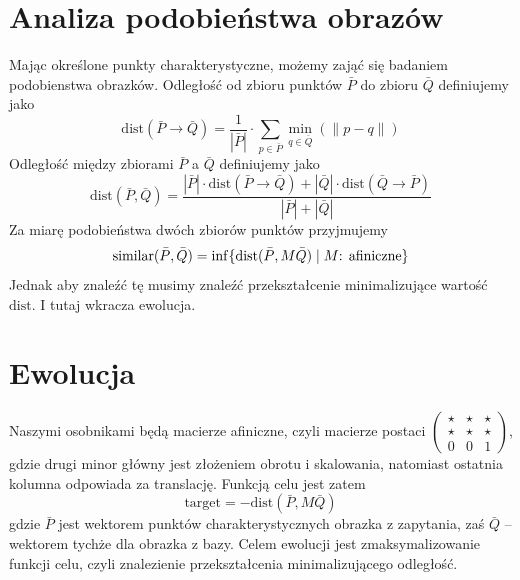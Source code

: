 \documentclass[a4paper,12pt,leqno]{article}
\newcommand{\nel}[1]{|#1|}
\newcommand{\dist}{\mathrm{dist}}
\newcommand{\target}{\mathrm{target}}
\begin{document}
\section{Analiza podobieństwa obrazów}

Mając określone punkty charakterystyczne, możemy zająć się badaniem podobienstwa obrazków.
Odległość od zbioru punktów $\bar P$ do zbioru $\bar Q$ definiujemy jako
\[ \dist(\bar P \rightarrow \bar Q) = \frac{1}{\nel{\bar P}} \cdot \sum_{p \in \bar P} \min_{q \in \bar Q}(\|p - q\|) \]
Odległość między zbiorami $\bar P$ a $\bar Q$ definiujemy jako
\[ \dist(\bar P, \bar Q) = \frac{\nel{\bar P} \cdot \dist(\bar P \rightarrow \bar Q) + \nel{\bar Q} \cdot \dist(\bar Q \rightarrow \bar P)}{\nel{\bar P} + \nel{\bar Q}} \]
Za miarę podobieństwa dwóch zbiorów punktów przyjmujemy
\[ \mathrm{similar}(\bar P, \bar Q) = \inf\{\dist(\bar P, M\bar Q) \;\arrowvert\; M\text{: afiniczne}\} \]
Jednak aby znaleźć tę musimy znaleźć przekształcenie minimalizujące wartość $\dist$. I tutaj wkracza ewolucja. 

\section{Ewolucja}

Naszymi osobnikami będą macierze afiniczne, czyli macierze postaci
$\begin{pmatrix}
\star & \star & \star \\
\star & \star & \star \\
0 & 0 & 1
\end{pmatrix}$, gdzie drugi minor główny jest złożeniem obrotu i skalowania, natomiast ostatnia kolumna odpowiada za translację.
Funkcją celu jest zatem 
\[ \target = -\dist(\bar P,  M\bar Q) \]
gdzie $\bar P$ jest wektorem punktów charakterystycznych obrazka z zapytania, zaś $\bar Q$ -- wektorem tychże dla obrazka z bazy.
Celem ewolucji jest zmaksymalizowanie funkcji celu, czyli znalezienie przekształcenia minimalizującego odległość.
\end{document}
